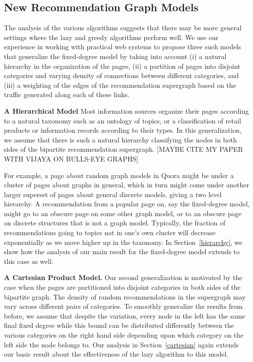 \subsection{New Recommendation Graph Models}
The analysis of the various algorithms suggests that there may be more general
settings where the lazy and greedy algorithms perform well. We use our
experience in working with practical web systems to propose three such models
that generalize the fixed-degree model by taking into account (i) a natural
hierarchy in the organization of the pages, (ii) a partition of pages into
disjoint categories and varying density of connections between different
categories, and (iii) a weighting of the edges of the recommendation supergraph
based on the traffic generated along each of these links. \vs

{\bf A Hierarchical Model} 
Most information sources organize their pages according to a natural taxonomy
such as an ontology of topics, or a classification of retail products or
information records according to their types. In this generalization, we assume
that there is such a natural hierarchy classifying the nodes in both sides of
the bipartite recommendation supergraph. [MAYBE CITE MY PAPER WITH
VIJAYA ON BULLS-EYE GRAPHS]


For example, a page about random graph models in Quora might be under a cluster
of pages about graphs in general, which in turn might come under another larger
superset of pages about general discrete models, giving a two level hierarchy.
A recommendation from a popular page on, say the fixed-degree model, might go to
an obscure page on some other graph model, or to an obscure page on discrete
structures that is not a graph model. Typically, the fraction of recommendations
going to topics not in one's own cluster will decrease exponentially as we move
higher up in the taxonomy. In Section~\ref{hierarchy}, we show how the analysis
of our main result for the fixed-degree model extends to this case as well. \vs

{\bf A Cartesian Product Model.}
Our second generalization is motivated by the case when the pages are
partitioned into disjoint categories in both sides of the bipartite graph. The
density of random recommendations in the supergraph may vary across different
pairs of categories. To smoothly generalize the results from before, we assume
that despite the variation, every node in the left has the same final fixed
degree while this bound can be distributed differently between the various
categories on the right hand side depending upon which category on the left side
the node belongs to.  Our analysis in Section~\ref{cartesian} again extends our
basic result about the effectiveness of the lazy algorithm to this model.\vs

